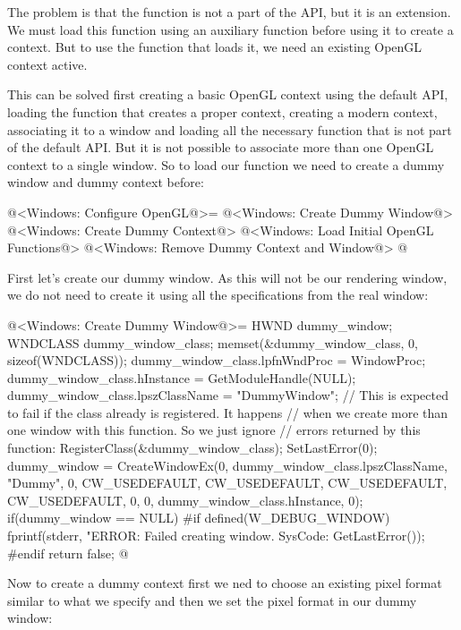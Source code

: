 The problem is that the
function  is not a part of the
API, but it is an extension. We must load this function using an
auxiliary function before using it to create a context. But to use the
function that loads it, we need an existing OpenGL context active.

This can be solved first creating a basic OpenGL context using the
default API, loading the function that creates a proper context,
creating a modern context, associating it to a window and loading all
the necessary function that is not part of the default API. But it is
not possible to associate more than one OpenGL context to a single
window. So to load our function we need to create a dummy window and
dummy context before:

\iniciocodigo
@<Windows: Configure OpenGL@>=
{
@<Windows: Create Dummy Window@>
@<Windows: Create Dummy Context@>
@<Windows: Load Initial OpenGL Functions@>
@<Windows: Remove Dummy Context and Window@>
}
@
\fimcodigo

First let's create our dummy window. As this will not be our rendering
window, we do not need to create it using all the specifications from
the real window:

\iniciocodigo
@<Windows: Create Dummy Window@>=
HWND dummy_window;
{
  WNDCLASS dummy_window_class;
  memset(&dummy_window_class, 0, sizeof(WNDCLASS));
  dummy_window_class.lpfnWndProc = WindowProc;
  dummy_window_class.hInstance = GetModuleHandle(NULL);
  dummy_window_class.lpszClassName = "DummyWindow";
  // This is expected to fail if the class already is registered. It happens
  // when we create more than one window with this function. So we just ignore
  // errors returned by this function:
  RegisterClass(&dummy_window_class);
  SetLastError(0);
  dummy_window = CreateWindowEx(0, dummy_window_class.lpszClassName, "Dummy",
                                0, CW_USEDEFAULT, CW_USEDEFAULT, CW_USEDEFAULT,
                                CW_USEDEFAULT, 0, 0,
                                dummy_window_class.hInstance, 0);
  if(dummy_window == NULL){
#if defined(W_DEBUG_WINDOW)
    fprintf(stderr, "ERROR: Failed creating window. SysCode: %
            GetLastError());
#endif
    return false;
  }
}
@
\fimcodigo

Now to create a dummy context first we ned to choose an existing pixel
format similar to what we specify and then we set the pixel format in
our dummy window:


